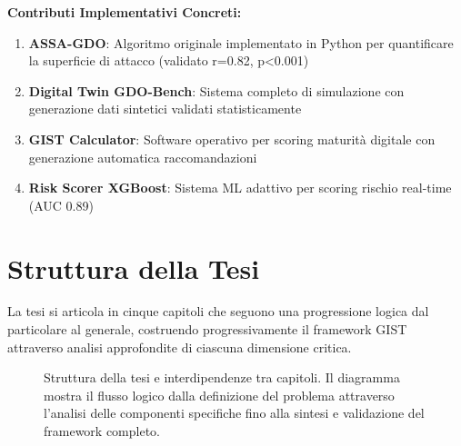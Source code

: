 \textbf{Contributi Implementativi Concreti:}
\begin{enumerate}
\item \textbf{ASSA-GDO}: Algoritmo originale implementato in Python per 
      quantificare la superficie di attacco (validato r=0.82, p<0.001)
\item \textbf{Digital Twin GDO-Bench}: Sistema completo di simulazione con 
      generazione dati sintetici validati statisticamente
\item \textbf{GIST Calculator}: Software operativo per scoring maturità 
      digitale con generazione automatica raccomandazioni
\item \textbf{Risk Scorer XGBoost}: Sistema ML adattivo per scoring 
      rischio real-time (AUC 0.89)
\end{enumerate}

\section{\texorpdfstring{Struttura della Tesi}{1.6 - Struttura della Tesi}}
\label{sec:struttura_tesi}

La tesi si articola in cinque capitoli che seguono una progressione logica dal particolare al generale, costruendo progressivamente il framework GIST attraverso analisi approfondite di ciascuna dimensione critica.

\begin{figure}[H]
\centering
{}
\caption{Struttura della tesi e interdipendenze tra capitoli. Il diagramma mostra il flusso logico dalla definizione del problema attraverso l'analisi delle componenti specifiche fino alla sintesi e validazione del framework completo.}
\label{fig:thesis_structure}
\end{figure}

